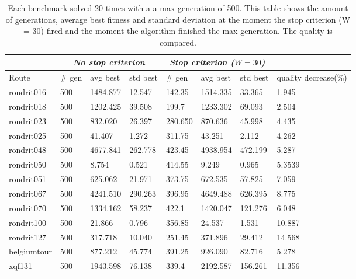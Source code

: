 \begin{table}[ht!]
    \centering
    \begin{tabular}{ l | l | l | l | l | l | l | l }
     & \multicolumn{3}{c|}{\textit{No stop criterion}} & \multicolumn{3}{c|}{\textit{Stop criterion ($W = 30$)}} & \\
    \hline
	Route & \# gen & avg best & std best & \# gen & avg best & std best & quality decrease(\%) \\ \hline
	rondrit016 & 500 & 1484.877 & 12.547 & 142.35 & 1514.335 & 33.365 & 1.945 \\ \hline
	rondrit018 & 500 & 1202.425 & 39.508 & 199.7 & 1233.302 & 69.093 & 2.504 \\ \hline
	rondrit023 & 500 & 832.020 & 26.397 & 280.650 & 870.636 & 45.998 & 4.435 \\ \hline
	rondrit025 & 500 & 41.407 & 1.272 & 311.75 & 43.251 & 2.112 & 4.262 \\ \hline
	rondrit048 & 500 & 4677.841 & 262.778 & 423.45 & 4938.954 & 472.199 & 5.287 \\ \hline
	rondrit050 & 500 & 8.754 & 0.521 & 414.55 & 9.249 & 0.965 & 5.3539 \\ \hline
	rondrit051 & 500 & 625.062 & 21.971 & 373.75 & 672.535 & 57.825 & 7.059 \\ \hline
	rondrit067 & 500 & 4241.510 & 290.263 & 396.95 & 4649.488 & 626.395 & 8.775 \\ \hline
	rondrit070 & 500 & 1334.162 & 58.237 & 422.1 & 1420.047 & 121.276 & 6.048 \\ \hline
	rondrit100 & 500 & 21.866 & 0.796 & 356.85 & 24.537 & 1.531 & 10.887 \\ \hline
	rondrit127 & 500 & 317.718 & 10.040 & 251.45 & 371.896 & 29.412 & 14.568 \\ \hline
	belgiumtour & 500 & 877.212 & 45.774 & 391.25 & 926.090 & 82.716 & 5.278 \\ \hline
	xqf131 & 500 & 1943.598 & 76.138 & 339.4 & 2192.587 & 156.261 & 11.356
    \end{tabular}
    \caption{Each benchmark solved 20 times with a a max generation of 500. This table shows the amount of generations, average best fitness and standard deviation at the moment the stop criterion (W = 30) fired and the moment the algorithm finished the max generation. The quality is compared.}
    \label{tab:window30}
\end{table}

